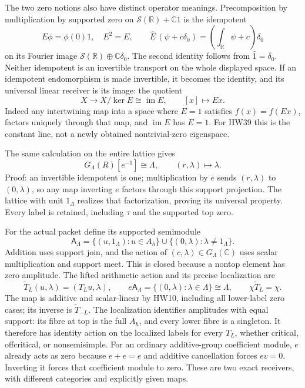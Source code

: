 \documentclass[11pt]{article}
\newcommand{\C}{\mathbb C}
\newcommand{\R}{\mathbb R}
\newcommand{\im}{\operatorname{im}}
\begin{document}
The two zero notions also have distinct operator meanings.
Precomposition by multiplication by supported zero on
\(\mathcal S(\R)+\C1\) is the idempotent
\[
 E\phi=\phi(0)1,\quad E^2=E,\qquad
 \widehat E\,(\psi+c\delta_0)
       =\left(\int_\R\psi+c\right)\delta_0
 \tag{HW39}
\]
on its Fourier image \(\mathcal S(\R)\oplus\C\delta_0\).
The second identity follows from \(\widehat1=\delta_0\).
Neither idempotent is an invertible transport on the whole
displayed space. If an idempotent endomorphism is made
invertible, it becomes the identity, and its universal linear
receiver is its image: the quotient
\[
 X\longrightarrow X/\ker E\cong\im E,\qquad [x]\longmapsto Ex .
 \tag{HW40}
\]
Indeed any intertwining map into a space where \(E=1\)
satisfies \(f(x)=f(Ex)\), factors uniquely through that map,
and \(\im E\) has \(E=1\). For HW39 this is the constant
line, not a newly obtained nontrivial-zero eigenspace.

The same calculation on the entire lattice gives
\[
 G_\Lambda(R)[e^{-1}]\cong\Lambda,\qquad
 (r,\lambda)\longmapsto\lambda .
 \tag{HW41}\label{hw:localization}
\]
Proof: an invertible idempotent is one; multiplication by
\(e\) sends \((r,\lambda)\) to \((0,\lambda)\), so any map
inverting \(e\) factors through this support projection.
The lattice with unit \(1_\Lambda\) realizes that factorization,
proving its universal property. Every label is retained,
including \(\tau\) and the supported top zero.

For the actual packet define its supported semimodule
\[
 \mathsf A_\Lambda
 =\{(u,1_\Lambda):u\in A_h\}
          \cup\{(0,\lambda):\lambda\ne1_\Lambda\}.
 \tag{HW42}
\]
Addition uses support join, and the action of
\((c,\lambda)\in G_\Lambda(\C)\) uses scalar multiplication
and support meet. This is closed because a nontop element
has zero amplitude. The lifted arithmetic action and its
precise localization are
\[
 \widetilde T_L(u,\lambda)=(T_Lu,\lambda),\qquad
 e\mathsf A_\Lambda=\{(0,\lambda):\lambda\in\Lambda\}
       \cong\Lambda,\qquad
 \chi\widetilde T_L=\chi.
 \tag{HW43}
\]
The map is additive and scalar-linear by HW10, including
all lower-label zero cases; its inverse is \(\widetilde T_{-L}\).
The localization identifies amplitudes with equal support:
its fibre at top is the full \(A_h\), and every lower fibre
is a singleton. It therefore has identity action on the
localized labels for every \(T_L\), whether critical,
offcritical, or nonsemisimple.
For an ordinary additive-group coefficient module, \(e\)
already acts as zero because \(e+e=e\) and additive
cancellation forces \(ev=0\). Inverting it forces that
coefficient module to zero. These are two exact receivers,
with different categories and explicitly given maps.
\end{document}
